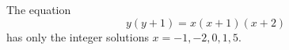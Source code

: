 \begin{proposition}\label{eq:061}
    The equation
\[
    y(y+1)=x(x+1)(x+2)
\]
    has only the integer solutions $x=-1,-2,0,1,5$.
\end{proposition}
